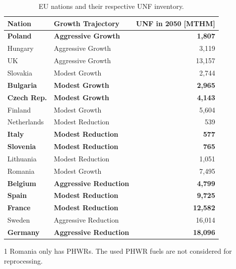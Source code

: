 \begin{table}[h]
    \centering
\begin{threeparttable}

    \caption {\gls{EU} nations and their respective \gls{UNF} inventory.} 
                \begin{tabular}{llr}
                    \hline 
                    \textbf{Nation} & \textbf{Growth Trajectory} & \small{\textbf{UNF in 2050 [MTHM] }}\\
                    \hline
                    \textbf{Poland} & \textbf{Aggressive Growth} & \textbf{1,807}\\
                    Hungary & Aggressive Growth & 3,119 \\ 
                    UK & Aggressive Growth & 13,157\\
                    Slovakia & Modest Growth & 2,744\\
                    \textbf{Bulgaria} & \textbf{Modest Growth} & \textbf{2,965} \\
                    \textbf{Czech Rep.} & \textbf{Modest Growth} & \textbf{4,143}\\
                    Finland & Modest Growth &  5,604\\
                    Netherlands & Modest Reduction & 539\\
                    \textbf{Italy} & \textbf{Modest Reduction} & \textbf{577}\\
                    \textbf{Slovenia} & \textbf{Modest Reduction} & \textbf{765}\\
                    Lithuania & Modest Reduction & 1,051 \\
                    Romania \tnote{1}  & Modest Growth & 7,495 \\
                    \textbf{Belgium} & \textbf{Aggressive Reduction} & \textbf{4,799}\\
                    \textbf{Spain} & \textbf{Modest Reduction} &  \textbf{9,725} \\
                    \textbf{France} & \textbf{Modest Reduction} & \textbf{12,582} \\
                    Sweden & Aggressive Reduction & 16,014\\
                    \textbf{Germany} & \textbf{Aggressive Reduction} & \textbf{18,096}\\
                    \hline
                \end{tabular}
    \begin{tablenotes}
    \item[1] Romania only has \glspl{PHWR}. The used \gls{PHWR} fuels are not
             considered for reprocessing.
    \end{tablenotes}

    \label{tab:which_send}

\end{threeparttable}

\end{table}


